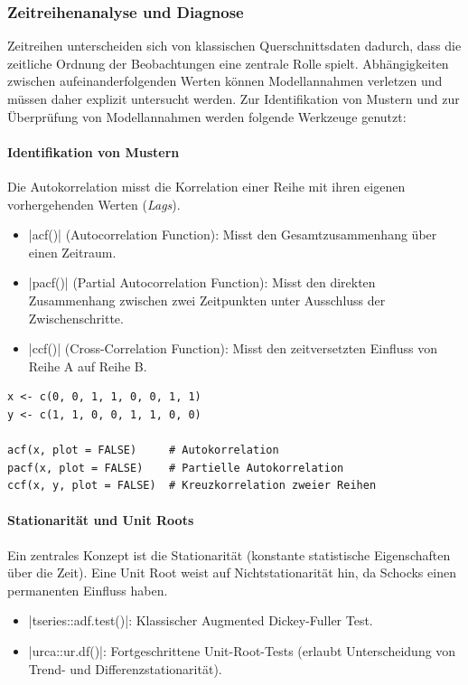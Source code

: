 \documentclass[10pt,twocolumn]{scrartcl}
\renewcommand{\lstinline}{\mycoloredinline}
\begin{document}
\subsubsection{Zeitreihenanalyse und Diagnose}

Zeitreihen unterscheiden sich von klassischen Querschnittsdaten dadurch, dass die zeitliche Ordnung der Beobachtungen eine zentrale Rolle spielt. Abhängigkeiten zwischen aufeinanderfolgenden Werten können Modellannahmen verletzen und müssen daher explizit untersucht werden.  Zur Identifikation von Mustern und zur Überprüfung von Modellannahmen werden folgende Werkzeuge genutzt:

\paragraph{Identifikation von Mustern}

Die Autokorrelation misst die Korrelation einer Reihe mit ihren eigenen vorhergehenden Werten (\emph{Lags}).

\begin{itemize}
\item \lstinline|acf()| (Autocorrelation Function): Misst den Gesamtzusammenhang über einen Zeitraum.
\item \lstinline|pacf()| (Partial Autocorrelation Function): Misst den direkten Zusammenhang zwischen zwei Zeitpunkten unter Ausschluss der Zwischenschritte.
\item \lstinline|ccf()| (Cross-Correlation Function): Misst den zeitversetzten Einfluss von Reihe A auf Reihe B.
\end{itemize}

\begin{lstlisting}
x <- c(0, 0, 1, 1, 0, 0, 1, 1)
y <- c(1, 1, 0, 0, 1, 1, 0, 0)

acf(x, plot = FALSE)     # Autokorrelation
pacf(x, plot = FALSE)    # Partielle Autokorrelation
ccf(x, y, plot = FALSE)  # Kreuzkorrelation zweier Reihen
\end{lstlisting}


\paragraph{Stationarität und Unit Roots}

Ein zentrales Konzept ist die Stationarität (konstante statistische Eigenschaften über die Zeit). Eine Unit Root weist auf Nichtstationarität hin, da Schocks einen permanenten Einfluss haben.

\begin{itemize}
\item \lstinline|tseries::adf.test()|: Klassischer Augmented Dickey-Fuller Test.
\item \lstinline|urca::ur.df()|: Fortgeschrittene Unit-Root-Tests (erlaubt Unterscheidung von Trend- und Differenzstationarität).
\end{itemize}
\end{document}
